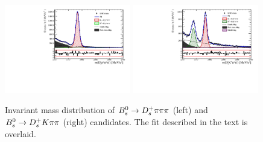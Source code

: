 \begin{figure}[h]
\centering
\includegraphics[height=!,width=0.49\textwidth]{figs/MassFit/norm_pull.pdf}
\includegraphics[height=!,width=0.49\textwidth]{figs/MassFit/signal_pull.pdf}
\caption{Invariant mass distribution of ${{B}^0_{s}}\rightarrow{\ensuremath{{D}^+_{s}}}{\ensuremath{\pi}}{\ensuremath{\pi}}{\ensuremath{\pi}}$ (left) and  ${{B}^0_{s}}\rightarrow{\ensuremath{{D}^+_{s}}}{\ensuremath{K}}{\ensuremath{\pi}}{\ensuremath{\pi}}$ (right) candidates. The fit described in the text is overlaid.}
\label{fig:massFit}
\end{figure}
